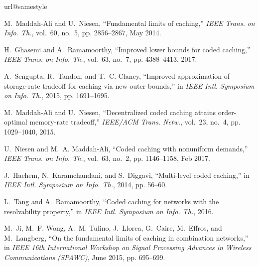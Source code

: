 \documentclass[journal,twocolumn]{IEEEtran}
\theoremstyle{definition}
\begin{document}
\begin{thebibliography}{10}
\providecommand{\url}[1]{#1}
\csname url@samestyle\endcsname
\providecommand{\newblock}{\relax}
\providecommand{\bibinfo}[2]{#2}
\providecommand{\BIBentrySTDinterwordspacing}{\spaceskip=0pt\relax}
\providecommand{\BIBentryALTinterwordstretchfactor}{4}
\providecommand{\BIBentryALTinterwordspacing}{\spaceskip=\fontdimen2\font plus
\BIBentryALTinterwordstretchfactor\fontdimen3\font minus
  \fontdimen4\font\relax}
\providecommand{\BIBforeignlanguage}[2]{{%
\expandafter\ifx\csname l@#1\endcsname\relax
\typeout{** WARNING: IEEEtran.bst: No hyphenation pattern has been}%
\typeout{** loaded for the language `#1'. Using the pattern for}%
\typeout{** the default language instead.}%
\else
\language=\csname l@#1\endcsname
\fi
#2}}
\providecommand{\BIBdecl}{\relax}
\BIBdecl

M.~Maddah-Ali and U.~Niesen, ``Fundamental limits of caching,'' \emph{IEEE
  Trans. on Info. Th.}, vol.~60, no.~5, pp. 2856--2867, May 2014.

H.~Ghasemi and A.~Ramamoorthy, ``{Improved lower bounds for coded caching},''
  \emph{IEEE Trans. on Info. Th.}, vol.~63, no.~7, pp. 4388--4413, 2017.

A.~Sengupta, R.~Tandon, and T.~C. Clancy, ``Improved approximation of
  storage-rate tradeoff for caching via new outer bounds,'' in \emph{IEEE Intl.
  Symposium on Info. Th.}, 2015, pp. 1691--1695.

M.~Maddah-Ali and U.~Niesen, ``Decentralized coded caching attains
  order-optimal memory-rate tradeoff,'' \emph{IEEE/ACM Trans. Netw.}, vol.~23,
  no.~4, pp. 1029--1040, 2015.

U.~Niesen and M.~A. Maddah-Ali, ``Coded caching with nonuniform demands,''
  \emph{IEEE Trans. on Info. Th.}, vol.~63, no.~2, pp. 1146--1158, Feb 2017.

J.~Hachem, N.~Karamchandani, and S.~Diggavi, ``Multi-level coded caching,'' in
  \emph{IEEE Intl. Symposium on Info. Th.}, 2014, pp. 56--60.

L.~Tang and A.~Ramamoorthy, ``Coded caching for networks with the resolvability
  property,'' in \emph{IEEE Intl. Symposium on Info. Th.}, 2016.

M.~Ji, M.~F. Wong, A.~M. Tulino, J.~Llorca, G.~Caire, M.~Effros, and
  M.~Langberg, ``On the fundamental limits of caching in combination
  networks,'' in \emph{IEEE 16th International Workshop on Signal Processing
  Advances in Wireless Communications (SPAWC)}, June 2015, pp. 695--699.


\end{thebibliography}
\end{document}

